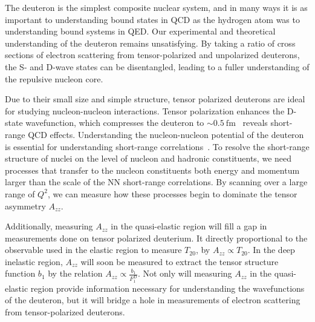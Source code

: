 
The deuteron is the simplest composite nuclear system, and in many ways it is as important to understanding bound states in QCD as the hydrogen atom was to understanding bound systems in QED.  Our experimental and theoretical understanding of the deuteron remains unsatisfying. By taking a ratio of cross sections of electron scattering from tensor-polarized and unpolarized deuterons, the S- and D-wave states can be disentangled, leading to a fuller understanding of the repulsive nucleon core. 

Due to their small size and simple structure, tensor polarized deuterons are ideal for studying nucleon-nucleon interactions. Tensor polarization enhances the D-state wavefunction, which compresses the deuteron to $\sim0.5\mathrm{~fm}$~\cite{Forest:1996kp} 
reveals short-range QCD effects. Understanding the nucleon-nucleon potential of the deuteron is essential for understanding short-range correlations~\cite{Arrington:2011xs}. To resolve the short-range structure of nuclei on the level of nucleon and hadronic constituents, we need processes that transfer to the nucleon constituents both energy and momentum larger than the scale of the NN short-range correlations. By scanning over a large range of $Q^2$, we can measure how these processes begin to dominate the tensor asymmetry $A_{zz}$.

Additionally, measuring $A_{zz}$ in the quasi-elastic region will fill a gap in measurements done on tensor polarized deuterium. It directly proportional to the observable used in the elastic region to measure $T_{20}$, by $A_{zz} \propto T_{20}$. In the deep inelastic region, $A_{zz}$ will soon be measured to extract the tensor structure function $b_1$ by the relation $A_{zz} \propto \frac{b_1}{F_1^D}$. Not only will measuring $A_{zz}$ in the quasi-elastic region provide information necessary for understanding the wavefunctions of the deuteron, but it will bridge a hole in measurements of electron scattering from tensor-polarized deuterons.



